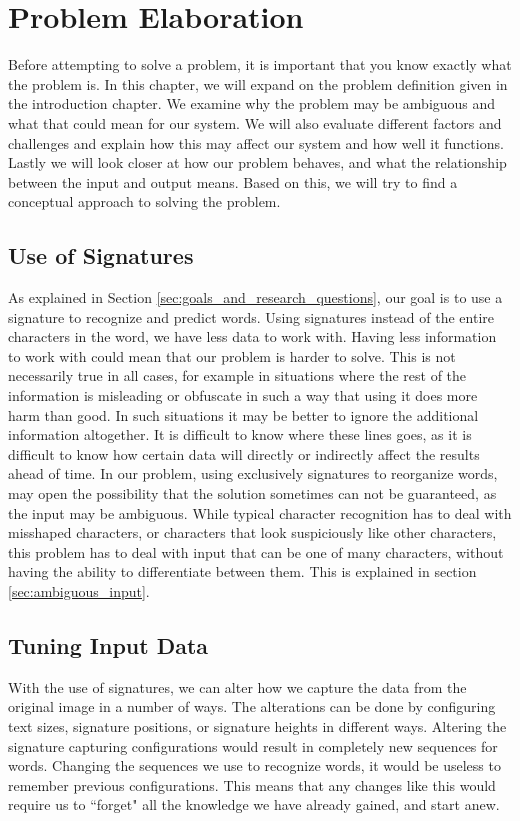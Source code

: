 
\chapter{Problem Elaboration}
\label{ch:problem}
Before attempting to solve a problem, it is important that you know exactly what the problem is. In this chapter, we will expand on the problem definition given in the introduction chapter. We examine why the problem may be ambiguous and what that could mean for our system. We will also evaluate different factors and challenges and explain how this may affect our system and how well it functions. Lastly we will look closer at how our problem behaves, and what the relationship between the input and output means. Based on this, we will try to find a conceptual approach to solving the problem.


\section{Use of Signatures}
As explained in Section \ref{sec:goals_and_research_questions}, our goal is to use a signature to recognize and predict words. Using signatures instead of the entire characters in the word, we have less data to work with. Having less information to work with could mean that our problem is harder to solve. This is not necessarily true in all cases, for example in situations where the rest of the information is misleading or obfuscate in such a way that using it does more harm than good. In such situations it may be better to ignore the additional information altogether. It is difficult to know where these lines goes, as it is difficult to know how certain data will directly or indirectly affect the results ahead of time. In our problem, using exclusively signatures to reorganize words, may open the possibility that the solution sometimes can not be guaranteed, as the input may be ambiguous. While typical character recognition has to deal with misshaped characters, or characters that look suspiciously like other characters, this problem has to deal with input that can be one of many characters, without having the ability to differentiate between them. This is explained in section \ref{sec:ambiguous_input}.


\section{Tuning Input Data}
\label{sec:tuning_input_data}
With the use of signatures, we can alter how we capture the data from the original image in a number of ways. The alterations can be done by configuring text sizes, signature positions, or signature heights in different ways. Altering the signature capturing configurations would result in completely new sequences for words. Changing the sequences we use to recognize words, it would be useless to remember previous configurations. This means that any changes like this would require us to ``forget" all the knowledge we have already gained, and start anew.


